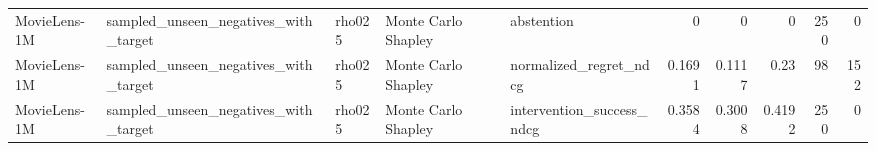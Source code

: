 \begin{table}[t]
{\begin{tabular}{lllllrrrrr}
MovieLens-1M & sampled\_unseen\_negatives\_with\_target & rho025 & Monte Carlo Shapley & abstention & 0 & 0 & 0 & 250 & 0 \\
MovieLens-1M & sampled\_unseen\_negatives\_with\_target & rho025 & Monte Carlo Shapley & normalized\_regret\_ndcg & 0.1691 & 0.1117 & 0.23 & 98 & 152 \\
MovieLens-1M & sampled\_unseen\_negatives\_with\_target & rho025 & Monte Carlo Shapley & intervention\_success\_ndcg & 0.3584 & 0.3008 & 0.4192 & 250 & 0 \\
\bottomrule
\end{tabular}
}
\end{table}
